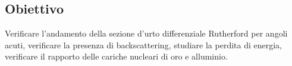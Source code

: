 \subsection{Obiettivo}

Verificare l'andamento della sezione d'urto differenziale Rutherford per angoli acuti,
verificare la presenza di backscattering,
studiare la perdita di energia,
verificare il rapporto delle cariche nucleari di oro e alluminio.
